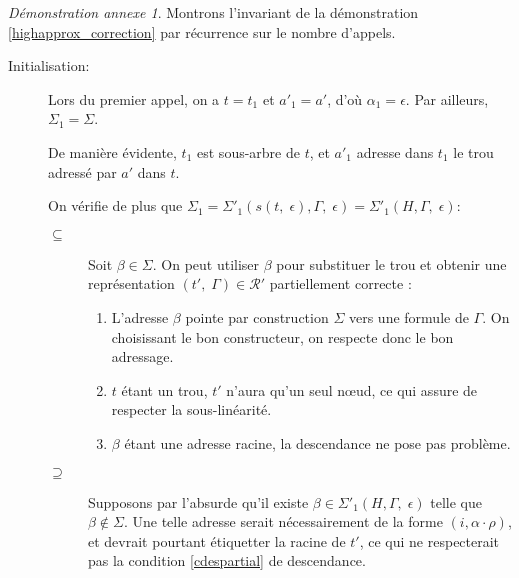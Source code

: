 \documentclass[11pt,a4paper]{article}
\theoremstyle{plain}
\theoremstyle{definition}
\theoremstyle{remark}
\newtheorem{demonstrationappendix}{Démonstration annexe}
\newcommand*{\someadd}{\rho}
\newcommand*{\sequent}{\Gamma}
\newcommand*{\representationspartial}{\ensuremath{\mathcal{R'}}}
\newcommand*{\highapprox}{\ensuremath{\Sigma_1}}
\newcommand*{\highapproxspec}{\ensuremath{\Sigma'_1}}
\newcommand*{\treesimplify}{\ensuremath{s}}
\begin{document}
\begin{demonstrationappendix}
    \label{highapprox_correction_proof}
    Montrons l'invariant de la démonstration \ref{highapprox_correction} par récurrence sur le nombre d'appels.

    \begin{description}
        \item[Initialisation:]
            Lors du premier appel, on a $t = t_1$ et $a'_1 = a'$, d'où $\alpha_1 = \epsilon$. Par ailleurs, $\highapprox = \Sigma$. 
    
            De manière évidente, $t_1$ est sous-arbre de $t$, et $a'_1$ adresse dans $t_1$ le trou adressé par $a'$ dans $t$.
            
            On vérifie de plus que $\highapprox = \highapproxspec \left( \treesimplify( t, \; \epsilon ), \sequent, \; \epsilon \right) = \highapproxspec \left( H, \sequent, \; \epsilon \right)$:
    
            \begin{description}
                \item[$\subseteq$] 
                Soit $\beta \in \Sigma$. On peut utiliser $\beta$ pour substituer le trou et obtenir une représentation $(t', \; \sequent) \in \representationspartial$ partiellement correcte :
        
                \begin{enumerate}
                    \item L'adresse $\beta$ pointe par construction $\Sigma$ vers une formule de $\sequent$. On choisissant le bon constructeur, on respecte donc le bon adressage.
        
                    \item $t$ étant un trou, $t'$ n'aura qu'un seul n\oe ud, ce qui assure de respecter la sous-linéarité.
        
                    \item $\beta$ étant une adresse racine, la descendance ne pose pas problème.
                \end{enumerate}
    
                \item[$\supseteq$]
                Supposons par l'absurde qu'il existe $\beta \in \highapproxspec \left( H, \sequent, \; \epsilon \right)$ telle que $\beta \notin \Sigma$. Une telle adresse serait nécessairement de la forme $(i, \alpha \cdot \someadd)$, et devrait pourtant étiquetter la racine de $t'$, ce qui ne respecterait pas la condition \ref{cdespartial} de descendance.
            \end{description}


\end{description}
\end{demonstrationappendix}
\end{document}

